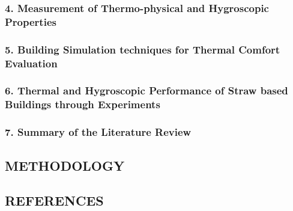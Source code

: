 \documentclass[]{article}
\begin{document}
\hypertarget{header-n65}{%
\subsubsection{4. Measurement of Thermo-physical and Hygroscopic
Properties}\label{header-n65}}

\hypertarget{header-n66}{%
\subsubsection{5. Building Simulation techniques for Thermal Comfort
Evaluation}\label{header-n66}}

\hypertarget{header-n67}{%
\subsubsection{6. Thermal and Hygroscopic Performance of Straw based
Buildings through Experiments}\label{header-n67}}

\hypertarget{header-n68}{%
\subsubsection{7. Summary of the Literature Review}\label{header-n68}}

\hypertarget{header-n69}{%
\subsection{METHODOLOGY}\label{header-n69}}

\hypertarget{header-n70}{%
\subsection{REFERENCES}\label{header-n70}}
\end{document}
